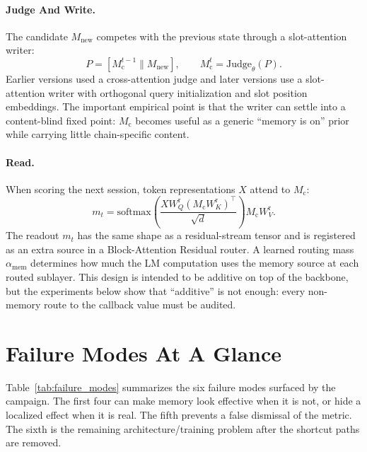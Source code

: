\documentclass{article}
\newcommand{\Mc}{M_{\mathrm{c}}}
\newcommand{\mt}{m_t}
\newcommand{\Mnew}{M_{\mathrm{new}}}
\newcommand{\amem}{\alpha_{\mathrm{mem}}}
\begin{document}
\paragraph{Judge And Write.}
The candidate $\Mnew$ competes with the previous state through a
slot-attention writer:
\begin{equation}
P=[\Mc^{t-1}\parallel \Mnew], \qquad
\Mc^t =
\mathrm{Judge}_{\theta}(P).
\end{equation}
Earlier versions used a cross-attention judge and later versions use a
slot-attention writer with orthogonal query initialization and slot
position embeddings.  The important empirical point is that the writer
can settle into a content-blind fixed point: $\Mc$ becomes useful as a
generic ``memory is on'' prior while carrying little chain-specific
content.

\paragraph{Read.}
When scoring the next session, token representations $X$ attend to
$\Mc$:
\begin{equation}
\mt =
\mathrm{softmax}\!\left(
  \frac{XW_Q^{\mathrm{r}}(\Mc W_K^{\mathrm{r}})^\top}{\sqrt d}
\right)\Mc W_V^{\mathrm{r}} .
\end{equation}
The readout $\mt$ has the same shape as a residual-stream tensor and is
registered as an extra source in a Block-Attention Residual router.  A
learned routing mass $\amem$ determines how much the LM computation uses
the memory source at each routed sublayer.  This design is intended to
be additive on top of the backbone, but the experiments below show that
``additive'' is not enough: every non-memory route to the callback value
must be audited.

\section{Failure Modes At A Glance}

Table~\ref{tab:failure_modes} summarizes the six failure modes surfaced
by the campaign.  The first four can make memory look effective when it
is not, or hide a localized effect when it is real.  The fifth prevents
a false dismissal of the metric.  The sixth is the remaining
architecture/training problem after the shortcut paths are removed.
\end{document}
